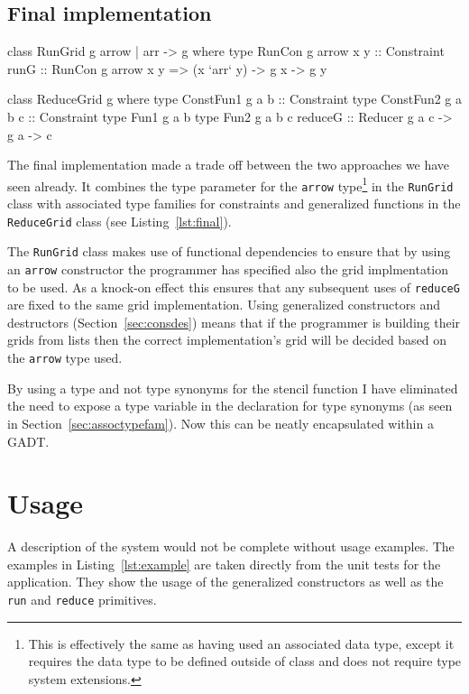 \documentclass[12pt,a4paper,twoside]{scrbook}
\begin{document}
\subsection{Final implementation}
\label{sec:final}

\begin{hflisting}[label=lst:final, caption={The final signatures of the
  \texttt{RunGrid} and \texttt{ReduceGrid} classes.}]
class RunGrid g arrow | arr -> g where
    type RunCon g arrow x y :: Constraint
    runG :: RunCon g arrow x y =>
            (x `arr` y)
            -> g x -> g y

class ReduceGrid g where
    type ConstFun1 g a b :: Constraint
    type ConstFun2 g a b c :: Constraint
    type Fun1 g a b
    type Fun2 g a b c
    reduceG :: Reducer g a c -> g a -> c
\end{hflisting}

The final implementation made a trade off between the two approaches we have
seen already. It combines the type parameter for the \texttt{arrow}
type\footnote{This is effectively the same as having used an associated data
  type, except it requires the data type to be defined outside of class and
  does not require type system extensions.} in the \texttt{RunGrid} class with
associated type families for constraints and generalized functions in the
\texttt{ReduceGrid} class (see Listing~\ref{lst:final}).

The \texttt{RunGrid} class makes use of functional dependencies to ensure that
by using an \texttt{arrow} constructor the programmer has specified also the grid
implmentation to be used. As a knock-on effect this ensures that any subsequent
uses of \texttt{reduceG} are fixed to the same grid implementation. Using
generalized constructors and destructors (Section~\ref{sec:consdes}) means that
if the programmer is building their grids from lists then the correct
implementation's grid will be decided based on the \texttt{arrow} type used.

By using a type and not type synonyms for the stencil function I have eliminated
the need to expose a type variable in the declaration for type synonyms (as seen
in Section~\ref{sec:assoctypefam}). Now this can be neatly encapsulated within a
GADT.

\section{Usage}

A description of the system would not be complete without usage examples. The
examples in Listing~\ref{lst:example} are taken directly from the unit tests for
the application. They show the usage of the generalized constructors as well as
the \texttt{run} and \texttt{reduce} primitives.
\end{document}
